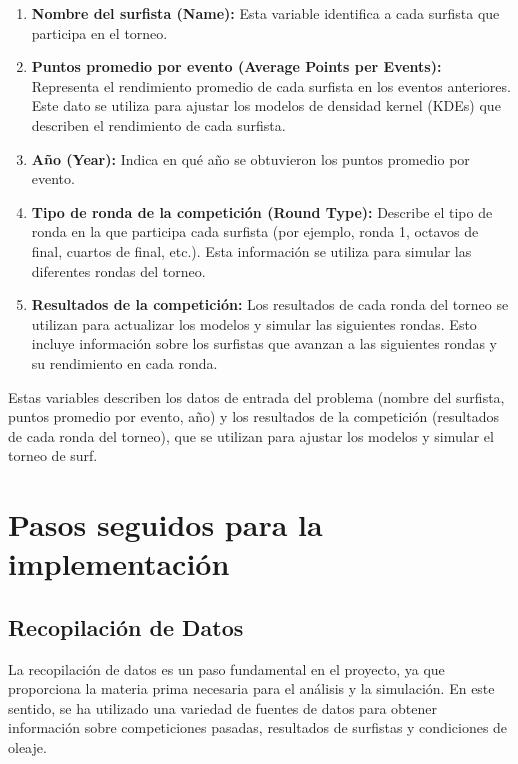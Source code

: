 \documentclass[12pt]{article}
\begin{document}
\begin{enumerate}
    \item \textbf{Nombre del surfista (Name):} Esta variable identifica a cada surfista que participa en el torneo.
    \item \textbf{Puntos promedio por evento (Average Points per Events):} Representa el rendimiento promedio de cada surfista en los eventos anteriores. Este dato se utiliza para ajustar los modelos de densidad kernel (KDEs) que describen el rendimiento de cada surfista.
    \item \textbf{Año (Year):} Indica en qué año se obtuvieron los puntos promedio por evento.
    \item \textbf{Tipo de ronda de la competición (Round Type):} Describe el tipo de ronda en la que participa cada surfista (por ejemplo, ronda 1, octavos de final, cuartos de final, etc.). Esta información se utiliza para simular las diferentes rondas del torneo.
    \item \textbf{Resultados de la competición:} Los resultados de cada ronda del torneo se utilizan para actualizar los modelos y simular las siguientes rondas. Esto incluye información sobre los surfistas que avanzan a las siguientes rondas y su rendimiento en cada ronda.
\end{enumerate}

Estas variables describen los datos de entrada del problema (nombre del surfista, puntos promedio por evento, año) y los resultados de la competición (resultados de cada ronda del torneo), que se utilizan para ajustar los modelos y simular el torneo de surf.

\section*{Pasos seguidos para la implementación}

\subsection*{Recopilación de Datos}

La recopilación de datos es un paso fundamental en el proyecto, ya que proporciona la materia prima necesaria para el análisis y la simulación. En este sentido, se ha utilizado una variedad de fuentes de datos para obtener información sobre competiciones pasadas, resultados de surfistas y condiciones de oleaje.
\end{document}
